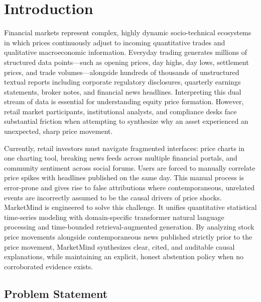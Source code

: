 \documentclass{article}
\begin{document}
	\pagebreak
	\section{Introduction}
    
	Financial markets represent complex, highly dynamic socio-technical ecosystems in which prices continuously adjust to incoming quantitative trades and qualitative macroeconomic information. Everyday trading generates millions of structured data points—such as opening prices, day highs, day lows, settlement prices, and trade volumes—alongside hundreds of thousands of unstructured textual reports including corporate regulatory disclosures, quarterly earnings statements, broker notes, and financial news headlines. Interpreting this dual stream of data is essential for understanding equity price formation. However, retail market participants, institutional analysts, and compliance desks face substantial friction when attempting to synthesize why an asset experienced an unexpected, sharp price movement.

	Currently, retail investors must navigate fragmented interfaces: price charts in one charting tool, breaking news feeds across multiple financial portals, and community sentiment across social forums. Users are forced to manually correlate price spikes with headlines published on the same day. This manual process is error-prone and gives rise to false attributions where contemporaneous, unrelated events are incorrectly assumed to be the causal drivers of price shocks. MarketMind is engineered to solve this challenge. It unifies quantitative statistical time-series modeling with domain-specific transformer natural language processing and time-bounded retrieval-augmented generation. By analyzing stock price movements alongside contemporaneous news published strictly prior to the price movement, MarketMind synthesizes clear, cited, and auditable causal explanations, while maintaining an explicit, honest abstention policy when no corroborated evidence exists.

	\subsection{Problem Statement}
\end{document}
